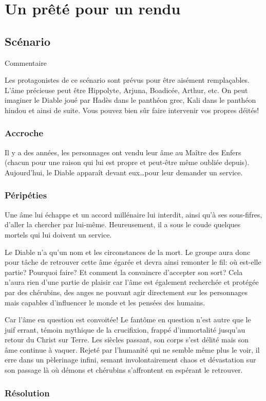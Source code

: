 \chapter{Un prêté pour un rendu}

\section{Scénario}

Commentaire

Les protagonistes de ce scénario sont prévus pour être aisément remplaçables. L'âme précieuse peut être Hippolyte, Arjuna, Boadicée, Arthur, etc. On peut imaginer le Diable joué par Hadès dans le panthéon grec, Kali dans le panthéon hindou et ainsi de suite. Vous pouvez bien sûr faire intervenir vos propres déités!

\subsection{Accroche}

Il y a des années, les personnages ont vendu leur âme au Maître des Enfers (chacun pour une raison qui lui est propre et peut-être même oubliée depuis).
Aujourd'hui, le Diable apparaît devant eux\dots pour leur demander un service.

\subsection{Péripéties}

Une âme lui échappe et un accord millénaire lui interdit, ainsi qu'à ses sous-fifres, d'aller la chercher par lui-même.
Heureusement, il a sous le coude quelques mortels qui lui doivent un service.

Le Diable n'a qu'un nom et les circonstances de la mort.
Le groupe aura donc pour tâche de retrouver cette âme égarée et devra ainsi remonter le fil: où est-elle partie?
Pourquoi faire?
Et comment la convaincre d'accepter son sort?
Cela n'aura rien d'une partie de plaisir car l'âme est également recherchée et protégée par des chérubins, des anges ne pouvant agir directement sur les personnages mais capables d'influencer le monde et les pensées des humains.

Car l'âme en question est convoitée!
Le fantôme en question n'est autre que le juif errant, témoin mythique de la crucifixion, frappé d'immortalité jusqu'au retour du Christ sur Terre.
Les siècles passant, son corps s'est délité mais son âme continue à vaquer.
Rejeté par l'humanité qui ne semble même plus le voir, il erre dans un pèlerinage infini, semant involontairement chaos et dévastation sur son passage là où démons et chérubins s'affrontent en espérant le retrouver.


\subsection{Résolution}
